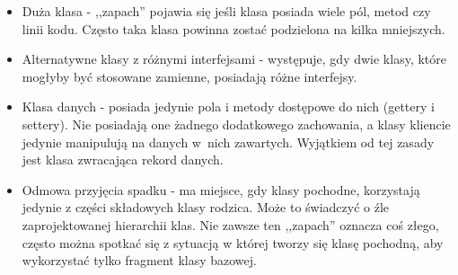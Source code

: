 \begin{itemize}
	\item Duża klasa - ,,zapach'' pojawia się jeśli klasa posiada wiele pól, metod czy linii kodu. Często taka klasa powinna zostać podzielona na kilka mniejszych.
	\item Alternatywne klasy z różnymi interfejsami - występuje, gdy dwie klasy, które mogłyby być stosowane zamienne, posiadają różne interfejsy. 
	\item Klasa danych - posiada jedynie pola i metody dostępowe do nich (gettery i settery). Nie posiadają one żadnego dodatkowego zachowania, a klasy kliencie jedynie manipulują na danych w~nich zawartych. Wyjątkiem od tej zasady jest klasa zwracająca rekord danych.  
	\item Odmowa przyjęcia spadku - ma miejsce, gdy klasy pochodne, korzystają jedynie z części składowych klasy rodzica. Może to świadczyć o źle zaprojektowanej hierarchii klas. Nie zawsze ten ,,zapach'' oznacza coś złego, często można spotkać się z sytuacją w której tworzy się klasę pochodną, aby wykorzystać tylko fragment klasy bazowej. 
\end{itemize}

